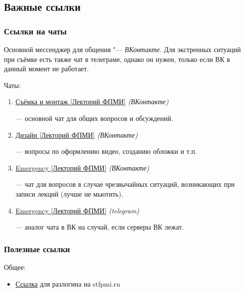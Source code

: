 \subsection{Важные ссылки}\label{ssec:important-links}

\subsubsection{Ссылки на чаты}\label{subsec:chat-references}
Основной мессенджер для общения "--- \textit{ВКонтакте}. Для экстренных ситуаций при съёмке есть также чат в телеграме, однако он нужен, только если ВК в данный момент не работает.

Чаты:
\begin{enumerate}
  \item \hypertarget{main-chat-vk}{\href{https://vk.me/join/AJQ1d6RhnwdxHuB8ojpaDKVN}{Съёмка и монтаж [Лекторий ФПМИ]} \textit{(ВКонтакте)}} --- основной чат для общих вопросов и обсуждений.

  \item \hypertarget{design-chat-vk}{\href{https://vk.me/join/QilCh_DTzzNjP18YmSD5L748qEL42loxLFA=}{Дизайн [Лекторий ФПМИ]} \textit{(ВКонтакте)}} --- вопросы по оформлению видео, созданию обложки и т.п.

  \item \hypertarget{emergency-chat-vk}{\href{https://vk.me/join/AJQ1d0vm9RxLwVfF_3bKMprQ}{Emergency [Лекторий ФПМИ]} \textit{(ВКонтакте)}} --- чат для вопросов в случае чрезвычайных ситуаций, возникающих при записи лекций (лучше не мьютить).

  \item \hypertarget{emergency-chat-tg}{\href{https://t.me/+WyQqZQYl2w8wYjAy}{Emergency [Лекторий ФПМИ]} \textit{(telegram)}} --- аналог чата в ВК на случай, если серверы ВК лежат.
\end{enumerate}

\subsubsection{Полезные ссылки}

Общее:
\begin{itemize}[topsep=1.5\parskip, itemsep=0.5\parskip]
  \item \href{https://infra.stfpmi.ru/auth/realms/stfpmi/account/#/}{Ссылка} для разлогина на stfpmi.ru
\end{itemize}

